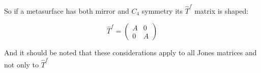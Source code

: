 So if a metasurface has both mirror and $C_4$ symmetry its $\hat T^f$ matrix is shaped:

\begin{equation}
    \hat T^f =
    \begin{pmatrix}
        A & 0 \\
        0 & A
    \end{pmatrix}
\end{equation}

And it should be noted that these considerations apply to all Jones matrices and not only to $\hat T^f$
